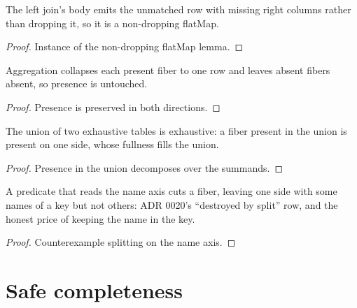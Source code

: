 \begin{theorem}
  \label{thm:leftjoin-exhaustive}\leanok
  The left join's body emits the unmatched row with missing right
  columns rather than dropping it, so it is a non-dropping flatMap.
\end{theorem}
\begin{proof}\leanok
  Instance of the non-dropping flatMap lemma.
\end{proof}

\begin{theorem}
  \label{thm:aggregate-exhaustive}\leanok
  Aggregation collapses each present fiber to one row and leaves absent
  fibers absent, so presence is untouched.
\end{theorem}
\begin{proof}\leanok
  Presence is preserved in both directions.
\end{proof}

\begin{theorem}
  \label{thm:union-exhaustive}\leanok
  The union of two exhaustive tables is exhaustive: a fiber present in
  the union is present on one side, whose fullness fills the union.
\end{theorem}
\begin{proof}\leanok
  Presence in the union decomposes over the summands.
\end{proof}

\begin{theorem}
  \label{thm:split-not-exhaustive}\leanok
  A predicate that reads the name axis cuts a fiber, leaving one side
  with some names of a key but not others: ADR 0020's ``destroyed by
  split'' row, and the honest price of keeping the name in the key.
\end{theorem}
\begin{proof}\leanok
  Counterexample splitting on the name axis.
\end{proof}

\chapter{Safe completeness}

